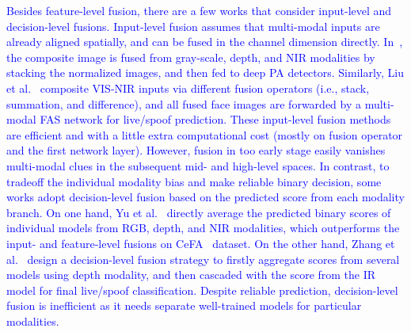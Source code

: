 \documentclass[10pt,journal,compsoc]{IEEEtran}
\begin{document}
\textcolor{blue}{Besides feature-level fusion, there are a few works that consider input-level and decision-level fusions. Input-level fusion assumes that multi-modal inputs are already aligned spatially, and can be fused in the channel dimension directly. In~\cite{nikisins2019domain}, the composite image is fused from gray-scale, depth, and NIR modalities by stacking the normalized images, and then fed to deep PA detectors. Similarly, Liu et al.~\cite{liu2021data} composite VIS-NIR inputs via different fusion operators (i.e., stack, summation, and difference), and all fused face images are forwarded by a multi-modal FAS network for live/spoof prediction. These input-level fusion methods are efficient and with a little extra computational cost (mostly on fusion operator and the first network layer). However, fusion in too early stage easily vanishes multi-modal clues in the subsequent mid- and high-level spaces. In contrast, to tradeoff the individual modality bias and make reliable binary decision, some works adopt decision-level fusion based on the predicted score from each modality branch. On one hand, Yu et al.~\cite{yu2020multi} directly average the predicted binary scores of individual models from RGB, depth, and NIR modalities, which outperforms the input- and feature-level fusions on CeFA~\cite{li2020casia} dataset. On the other hand, Zhang et al.~\cite{zhang2019feathernets} design a decision-level fusion strategy to firstly aggregate scores from several models using depth modality, and then cascaded with the score from the IR model for final live/spoof classification. Despite reliable prediction, decision-level fusion is inefficient as it needs separate well-trained models for particular modalities. }     

\vspace{0.4em}
\end{document}
